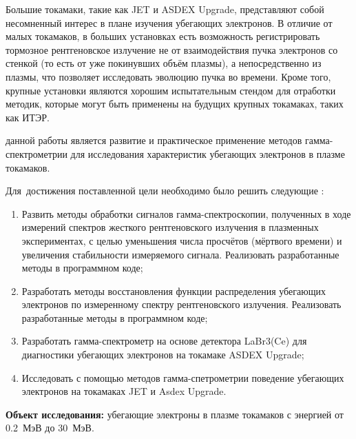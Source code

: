 Большие токамаки, такие как JET и ASDEX Upgrade, представляют собой несомненный интерес в плане изучения убегающих электронов. В отличие от малых токамаков, в больших установках есть возможность регистрировать тормозное рентгеновское излучение не от взаимодействия пучка электронов со стенкой (то есть от уже покинувших объём плазмы), а непосредственно из плазмы, что позволяет исследовать эволюцию пучка во времени. Кроме того, крупные установки являются хорошим испытательным стендом для отработки методик, которые могут быть применены на будущих крупных токамаках, таких как ИТЭР. 




{\aim} данной работы является развитие и практическое применение методов гамма-спектрометрии для исследования характеристик убегающих электронов в плазме токамаков.

Для~достижения поставленной цели необходимо было решить следующие {\tasks}:
\begin{enumerate}[beginpenalty=10000] %
  \item Развить методы обработки сигналов гамма-спектроскопии, полученных в ходе измерений спектров жесткого рентгеновского излучения в плазменных экспериментах, с целью уменьшения числа просчётов (мёртвого времени) и увеличения стабильности измеряемого сигнала. Реализовать разработанные методы в программном коде;
  \item Разработать методы восстановления функции распределения убегающих электронов по измеренному спектру рентгеновского излучения. Реализовать разработанные методы в программном коде;
  \item Разработать гамма-спектрометр на основе детектора LaBr3(Ce) для диагностики убегающих электронов на токамаке ASDEX Upgrade;
  \item Исследовать с помощью методов гамма-спетрометрии поведение убегающих электронов на токамаках JET и Asdex Upgrade.
\end{enumerate}

\textbf{Объект исследования:} убегающие электроны в плазме токамаков с энергией от 0.2~МэВ до 30~МэВ.


